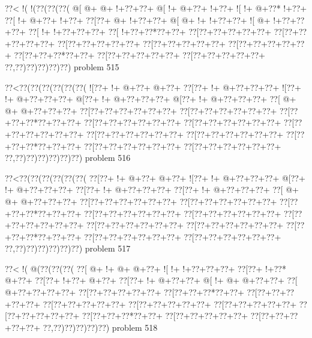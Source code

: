 \vbox{\vbox{\goo
\0??<\- !(\- !(\0??(\0??(\0??(
\- @[\- @+\- @+\- !+\0??+\0??+
\- @[\- !+\- @+\0??+\- !+\0??+
\- ![\- !+\- @+\0??*\- !+\0??+
\0??[\- !+\- @+\0??+\- !+\0??+
\0??[\0??+\- @+\- !+\0??+\0??+
\- @[\- @+\- !+\- !+\0??+\0??+
\- ![\- @+\- !+\0??+\0??+\0??+
\0??[\- !+\- !+\0??+\0??+\0??+
\0??[\- !+\0??+\0??*\0??+\0??+
\0??[\0??+\0??+\0??+\0??+\0??+
\0??[\0??+\0??+\0??+\0??+\0??+
\0??[\0??+\0??+\0??+\0??+\0??+
\0??[\0??+\0??+\0??+\0??+\0??+
\0??[\0??+\0??+\0??+\0??+\0??+
\0??[\0??+\0??+\0??*\0??+\0??+
\0??[\0??+\0??+\0??+\0??+\0??+
\0??[\0??+\0??+\0??+\0??+\0??+
\0??,\0??)\0??)\0??)\0??)\0??)
}
\hfil problem 515\hfil\break
}

\vbox{\vbox{\goo
\0??<\0??(\0??(\0??(\0??(\0??(\0??(
\- ![\0??+\- !+\- @+\0??+\- @+\0??+
\0??[\0??+\- !+\- @+\0??+\0??+\0??+
\- ![\0??+\- !+\- @+\0??+\0??+\0??+
\- @[\0??+\- !+\- @+\0??+\0??+\0??+
\- @[\0??+\- !+\- @+\0??+\0??+\0??+
\0??[\- @+\- @+\- @+\0??+\0??+\0??+
\0??[\0??+\0??+\0??+\0??+\0??+\0??+
\0??[\0??+\0??+\0??+\0??+\0??+\0??+
\0??[\0??+\0??+\0??*\0??+\0??+\0??+
\0??[\0??+\0??+\0??+\0??+\0??+\0??+
\0??[\0??+\0??+\0??+\0??+\0??+\0??+
\0??[\0??+\0??+\0??+\0??+\0??+\0??+
\0??[\0??+\0??+\0??+\0??+\0??+\0??+
\0??[\0??+\0??+\0??+\0??+\0??+\0??+
\0??[\0??+\0??+\0??*\0??+\0??+\0??+
\0??[\0??+\0??+\0??+\0??+\0??+\0??+
\0??[\0??+\0??+\0??+\0??+\0??+\0??+
\0??,\0??)\0??)\0??)\0??)\0??)\0??)
}
\hfil problem 516\hfil\break
}

\vbox{\vbox{\goo
\0??<\0??(\0??(\0??(\0??(\0??(\0??(
\0??[\0??+\- !+\- @+\0??+\- @+\0??+
\- ![\0??+\- !+\- @+\0??+\0??+\0??+
\- @[\0??+\- !+\- @+\0??+\0??+\0??+
\0??[\0??+\- !+\- @+\0??+\0??+\0??+
\0??[\0??+\- !+\- @+\0??+\0??+\0??+
\0??[\- @+\- @+\- @+\0??+\0??+\0??+
\0??[\0??+\0??+\0??+\0??+\0??+\0??+
\0??[\0??+\0??+\0??+\0??+\0??+\0??+
\0??[\0??+\0??+\0??*\0??+\0??+\0??+
\0??[\0??+\0??+\0??+\0??+\0??+\0??+
\0??[\0??+\0??+\0??+\0??+\0??+\0??+
\0??[\0??+\0??+\0??+\0??+\0??+\0??+
\0??[\0??+\0??+\0??+\0??+\0??+\0??+
\0??[\0??+\0??+\0??+\0??+\0??+\0??+
\0??[\0??+\0??+\0??*\0??+\0??+\0??+
\0??[\0??+\0??+\0??+\0??+\0??+\0??+
\0??[\0??+\0??+\0??+\0??+\0??+\0??+
\0??,\0??)\0??)\0??)\0??)\0??)\0??)
}
\hfil problem 517\hfil\break
}

\vbox{\vbox{\goo
\0??<\- !(\- @(\0??(\0??(\0??(
\0??[\- @+\- !+\- @+\- @+\0??+
\- ![\- !+\- !+\0??+\0??+\0??+
\0??[\0??+\- !+\0??*\- @+\0??+
\0??[\0??+\- !+\0??+\- @+\0??+
\0??[\0??+\- !+\- @+\0??+\0??+
\- @[\- !+\- @+\- @+\0??+\0??+
\0??[\- @+\0??+\0??+\0??+\0??+
\0??[\0??+\0??+\0??+\0??+\0??+
\0??[\0??+\0??+\0??*\0??+\0??+
\0??[\0??+\0??+\0??+\0??+\0??+
\0??[\0??+\0??+\0??+\0??+\0??+
\0??[\0??+\0??+\0??+\0??+\0??+
\0??[\0??+\0??+\0??+\0??+\0??+
\0??[\0??+\0??+\0??+\0??+\0??+
\0??[\0??+\0??+\0??*\0??+\0??+
\0??[\0??+\0??+\0??+\0??+\0??+
\0??[\0??+\0??+\0??+\0??+\0??+
\0??,\0??)\0??)\0??)\0??)\0??)
}
\hfil problem 518\hfil\break
}

